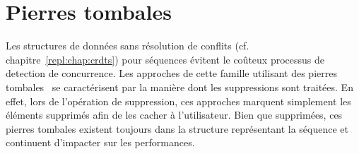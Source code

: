 

\section{Pierres tombales}

Les structures de données sans résolution de conflits
(cf. chapitre~\ref{repl:chap:crdts}) pour séquences évitent le coûteux processus
de detection de concurrence. Les approches de cette famille utilisant des
pierres tombales~\cite{ahmed2011evaluating, conway2014language,
  grishchenko2010deep, oster2006data, preguica2009commutative,
  roh2011replicated, weiss2007wooki, wu2010partial, yu2012stringwise} se
caractérisent par la manière dont les suppressions sont traitées. En effet, lors
de l'opération de suppression, ces approches marquent simplement les éléments
supprimés afin de les cacher à l'utilisateur. Bien que supprimées, ces pierres
tombales existent toujours dans la structure représentant la séquence et
continuent d'impacter sur les performances.

